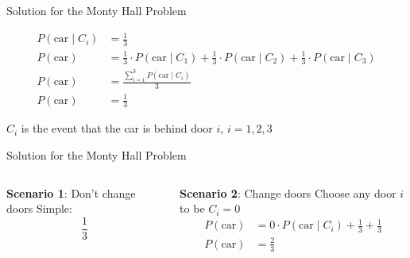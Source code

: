 \begin{frame}{Solution for the Monty Hall Problem}
	\begin{idea}
		$$
			\begin{aligned}
				P(\text{car} \mid C_i) & = \frac{1}{3}                                                                                                                    \\
				P(\text{car})          & = \frac{1}{3} \cdot P(\text{car} \mid C_1) + \frac{1}{3} \cdot P(\text{car} \mid C_2) + \frac{1}{3} \cdot P(\text{car} \mid C_3) \\
				P(\text{car})          & = \frac{\sum^3_{i=1}P(\text{car} \mid C_i)}{3}                                                                                   \\
				P(\text{car})          & = \frac{1}{3}
			\end{aligned}
		$$
	\end{idea}
	\vfill \vfill
	$C_i$ is the event that the car is behind door $i$, $i=1,2,3$
\end{frame}

\begin{frame}[t]{Solution for the Monty Hall Problem}
	\begin{columns}[t]
		\begin{column}{0.5\textwidth}
			{\Large \textbf{Scenario 1}: Don't change doors} \newline \newline
			Simple: $$\frac{1}{3}$$
		\end{column}
		\begin{column}{0.5\textwidth}
			{\Large \textbf{Scenario 2}: Change doors} \newline \newline
			Choose any door $i$ to be $C_i = 0$
			\vfill
			$$
				\begin{aligned}
					P(\text{car}) & = 0 \cdot P(\text{car} \mid C_i) + \frac{1}{3} + \frac{1}{3} \\
					P(\text{car}) & = \frac{2}{3}
				\end{aligned}
			$$
		\end{column}
	\end{columns}
\end{frame}

